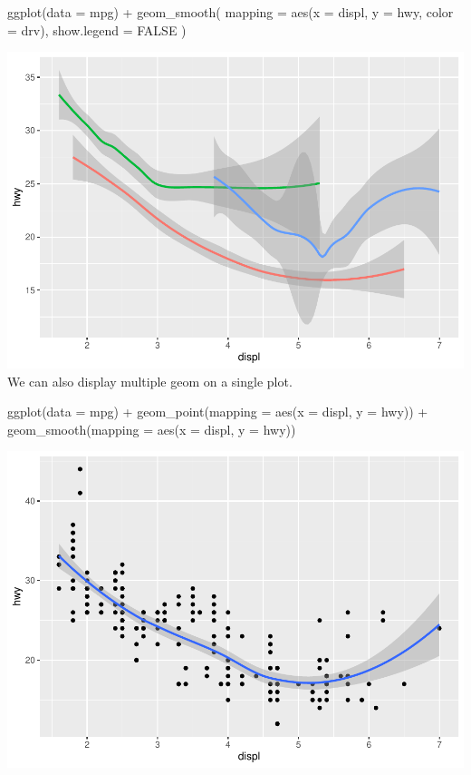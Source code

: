\documentclass[
]{article}
\newenvironment{Shaded}{\begin{snugshade}}{\end{snugshade}}
\newcommand{\AttributeTok}[1]{\textcolor[rgb]{0.77,0.63,0.00}{#1}}
\newcommand{\ConstantTok}[1]{\textcolor[rgb]{0.00,0.00,0.00}{#1}}
\newcommand{\FunctionTok}[1]{\textcolor[rgb]{0.00,0.00,0.00}{#1}}
\newcommand{\NormalTok}[1]{#1}
\newcommand{\SpecialCharTok}[1]{\textcolor[rgb]{0.00,0.00,0.00}{#1}}
\begin{document}
\begin{Shaded}
\begin{Highlighting}[]
\FunctionTok{ggplot}\NormalTok{(}\AttributeTok{data =}\NormalTok{ mpg) }\SpecialCharTok{+}
  \FunctionTok{geom\_smooth}\NormalTok{(}
    \AttributeTok{mapping =} \FunctionTok{aes}\NormalTok{(}\AttributeTok{x =}\NormalTok{ displ, }\AttributeTok{y =}\NormalTok{ hwy, }\AttributeTok{color =}\NormalTok{ drv),}
    \AttributeTok{show.legend =} \ConstantTok{FALSE}
\NormalTok{  )}
\end{Highlighting}
\end{Shaded}

\includegraphics{Journal_files/figure-latex/unnamed-chunk-48-3.pdf} We
can also display multiple geom on a single plot.

\begin{Shaded}
\begin{Highlighting}[]
\FunctionTok{ggplot}\NormalTok{(}\AttributeTok{data =}\NormalTok{ mpg) }\SpecialCharTok{+} 
  \FunctionTok{geom\_point}\NormalTok{(}\AttributeTok{mapping =} \FunctionTok{aes}\NormalTok{(}\AttributeTok{x =}\NormalTok{ displ, }\AttributeTok{y =}\NormalTok{ hwy)) }\SpecialCharTok{+}
  \FunctionTok{geom\_smooth}\NormalTok{(}\AttributeTok{mapping =} \FunctionTok{aes}\NormalTok{(}\AttributeTok{x =}\NormalTok{ displ, }\AttributeTok{y =}\NormalTok{ hwy))}
\end{Highlighting}
\end{Shaded}

\includegraphics{Journal_files/figure-latex/unnamed-chunk-49-1.pdf}
\end{document}

